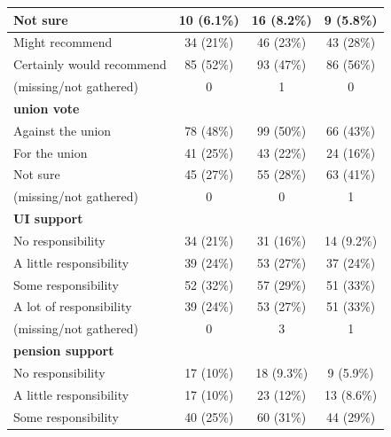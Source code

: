 \documentclass[
  11pt,
  oneside]{article}
\begin{document}
\begin{table}
\begin{tabular}[t]{l|c|c|c}
\hline
\hspace{1em}Not sure & 10 (6.1\%) & 16 (8.2\%) & 9 (5.8\%)\\
\hline
\hspace{1em}Might recommend & 34 (21\%) & 46 (23\%) & 43 (28\%)\\
\hline
\hspace{1em}Certainly would recommend & 85 (52\%) & 93 (47\%) & 86 (56\%)\\
\hline
\hspace{1em}(missing/not gathered) & 0 & 1 & 0\\
\hline
\textbf{union vote} &  &  & \\
\hline
\hspace{1em}Against the union & 78 (48\%) & 99 (50\%) & 66 (43\%)\\
\hline
\hspace{1em}For the union & 41 (25\%) & 43 (22\%) & 24 (16\%)\\
\hline
\hspace{1em}Not sure & 45 (27\%) & 55 (28\%) & 63 (41\%)\\
\hline
\hspace{1em}(missing/not gathered) & 0 & 0 & 1\\
\hline
\textbf{UI support} &  &  & \\
\hline
\hspace{1em}No responsibility & 34 (21\%) & 31 (16\%) & 14 (9.2\%)\\
\hline
\hspace{1em}A little responsibility & 39 (24\%) & 53 (27\%) & 37 (24\%)\\
\hline
\hspace{1em}Some responsibility & 52 (32\%) & 57 (29\%) & 51 (33\%)\\
\hline
\hspace{1em}A lot of responsibility & 39 (24\%) & 53 (27\%) & 51 (33\%)\\
\hline
\hspace{1em}(missing/not gathered) & 0 & 3 & 1\\
\hline
\textbf{pension support} &  &  & \\
\hline
\hspace{1em}No responsibility & 17 (10\%) & 18 (9.3\%) & 9 (5.9\%)\\
\hline
\hspace{1em}A little responsibility & 17 (10\%) & 23 (12\%) & 13 (8.6\%)\\
\hline
\hspace{1em}Some responsibility & 40 (25\%) & 60 (31\%) & 44 (29\%)\\

\end{tabular}
\end{table}
\end{document}
